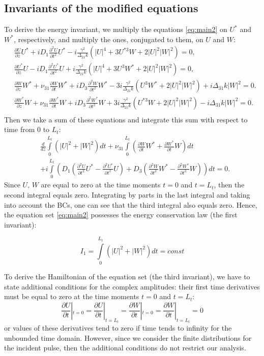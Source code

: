 \documentclass[a4paper, 12pt, onecolumn]{extarticle}
\begin{document}
\subsection*{Invariants of the modified equations}
To derive the energy invariant, we multiply the equations \eqref{eq:main2} on \(U^*\) and \(W^*\), respectively, and multiply the ones, conjugated to them, on \(U\) and \(W\):
\[
\begin{aligned}
&\frac{\partial U}{\partial z}U^*+iD_1\frac{\partial^2 U}{\partial t^2}U^*-i\frac{\gamma^2}{\Delta_{21} k}(|U|^4+3U^{*3}W+2|U|^2|W|^2)=0,\\
&\frac{\partial U^*}{\partial z}U-iD_1\frac{\partial^2 U^*}{\partial t^2}U+i\frac{\gamma^2}{\Delta_{21} k}(|U|^4+3U^{3}W^*+2|U|^2|W|^2)=0,\\
&\frac{\partial W}{\partial z}W^*+\nu_{31}\frac{\partial{W}}{\partial t}W^*+iD_3\frac{\partial^2 W}{\partial t^2}W^*-3i\frac{\gamma^2}{\Delta_{21} k}(U^3W^*+2|U|^2|W|^2)+i\Delta_{31}k|W|^2=0.\\
&\frac{\partial W^*}{\partial z}W+\nu_{31}\frac{\partial{W^*}}{\partial t}W+iD_3\frac{\partial^2 W^*}{\partial t^2}W+3i\frac{\gamma^2}{\Delta_{21} k}(U^{*3}W+2|U|^2|W|^2)-i\Delta_{31}k|W|^2=0.\\
\end{aligned}
\]
Then we take a sum of these equations and integrate this sum with respect to time from \(0\) to \(L_t\):
\[
\begin{aligned}
&\frac{d}{dz}\int\limits_0^{L_t}\left(|U|^2+|W|^2\right)dt+\nu_{31}\int\limits_0^{L_t}\left(\frac{\partial{W}}{\partial t}W^*+\frac{\partial{W^*}}{\partial t}W\right)dt\\
&+i\int\limits_0^{L_t}\left(D_1(\frac{\partial^2 U}{\partial t^2}U^*-\frac{\partial^2 U^*}{\partial t^2}U)+D_3(\frac{\partial^2 W}{\partial t^2}W^*-\frac{\partial^2 W^*}{\partial t^2}W)\right)dt=0.
\end{aligned}
\]
Since \(U,\,W\) are equal to zero at the time moments \(t=0\) and \(t=L_t\), then the second integral equals zero. Integrating by parts in the last integral and taking into account the BCs, one can see that the third integral also equals zero.  Hence, the equation set \eqref{eq:main2} possesses the energy conservation law (the first invariant): 

\begin{equation}
\label{eq:ninv1}
I_1=\int\limits_0^{L_t}\left(|U|^2+|W|^2\right)dt=const
\end{equation}

To derive the Hamiltonian of the equation set (the third invariant), we have to state additional conditions for the complex amplitudes: their first time derivatives must be equal to zero at the time moments \(t=0\) and \(t=L_t\):
\[\frac{\partial U}{\partial t}|_{t=0}=\frac{\partial U}{\partial t}|_{t=L_t}=\frac{\partial W}{\partial t}|_{t=0}=\frac{\partial W}{\partial t}|_{t=L_t}=0\]
or values of these derivatives tend to zero if time tends to infinity for the unbounded time domain. However, since we consider the finite distributions for the incident pulse, then the additional conditions do not restrict our analysis.
\end{document}
